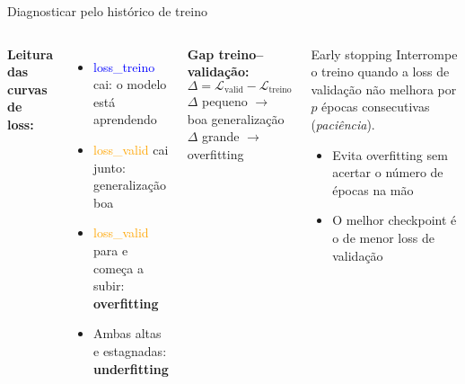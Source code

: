 \documentclass[aspectratio=169]{beamer}
\begin{document}
\begin{frame}{Diagnosticar pelo histórico de treino}
\begin{columns}
\textbf{Leitura das curvas de loss:}
\begin{itemize}
  \item \textcolor{blue}{loss\_treino} cai: o modelo está aprendendo
  \item \textcolor{orange}{loss\_valid} cai junto: generalização boa
  \item \textcolor{orange}{loss\_valid} para e começa a subir: \textbf{overfitting}
  \item Ambas altas e estagnadas: \textbf{underfitting}
\end{itemize}
\vspace{8pt}
\textbf{Gap treino–validação:}
\[
  \Delta = \mathcal{L}_{\text{valid}} - \mathcal{L}_{\text{treino}}
\]
$\Delta$ pequeno $\to$ boa generalização \quad $\Delta$ grande $\to$ overfitting
\begin{block}{Early stopping}
  Interrompe o treino quando a loss de validação não melhora por $p$ épocas consecutivas (\textit{paciência}).\\[4pt]
  \begin{itemize}
    \item Evita overfitting sem acertar o número de épocas na mão
    \item O melhor checkpoint é o de menor loss de validação
  \end{itemize}
\end{block}
\end{columns}
\end{frame}
\end{document}
